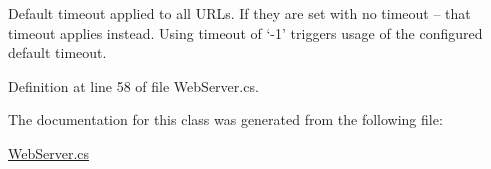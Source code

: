 Default timeout applied to all U\+R\+Ls. If they are set with no timeout – that timeout applies instead. Using timeout of ‘-\/1’ triggers usage of the configured default timeout. 



Definition at line 58 of file Web\+Server.\+cs.



The documentation for this class was generated from the following file\+:\begin{DoxyCompactItemize}
\item 
\mbox{\hyperlink{_web_server_8cs}{Web\+Server.\+cs}}\end{DoxyCompactItemize}
